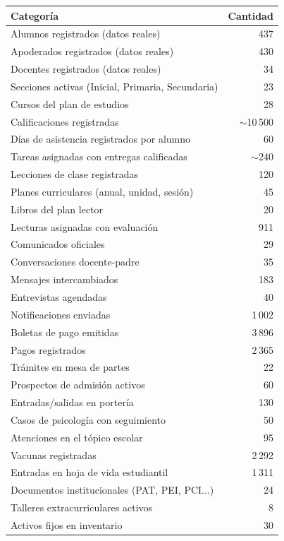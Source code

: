 \documentclass[11pt,a4paper]{article}
\begin{document}
\begin{tabularx}{\textwidth}{@{}Xr@{}}
\toprule
\textbf{Categoría} & \textbf{Cantidad} \\
\midrule
Alumnos registrados (datos reales) & 437 \\
Apoderados registrados (datos reales) & 430 \\
Docentes registrados (datos reales) & 34 \\
Secciones activas (Inicial, Primaria, Secundaria) & 23 \\
Cursos del plan de estudios & 28 \\
\addlinespace
Calificaciones registradas & $\sim$10\,500 \\
Días de asistencia registrados por alumno & 60 \\
Tareas asignadas con entregas calificadas & $\sim$240 \\
Lecciones de clase registradas & 120 \\
Planes curriculares (anual, unidad, sesión) & 45 \\
Libros del plan lector & 20 \\
Lecturas asignadas con evaluación & 911 \\
\addlinespace
Comunicados oficiales & 29 \\
Conversaciones docente-padre & 35 \\
Mensajes intercambiados & 183 \\
Entrevistas agendadas & 40 \\
Notificaciones enviadas & 1\,002 \\
\addlinespace
Boletas de pago emitidas & 3\,896 \\
Pagos registrados & 2\,365 \\
Trámites en mesa de partes & 22 \\
Prospectos de admisión activos & 60 \\
Entradas/salidas en portería & 130 \\
\addlinespace
Casos de psicología con seguimiento & 50 \\
Atenciones en el tópico escolar & 95 \\
Vacunas registradas & 2\,292 \\
Entradas en hoja de vida estudiantil & 1\,311 \\
\addlinespace
Documentos institucionales (PAT, PEI, PCI...) & 24 \\
Talleres extracurriculares activos & 8 \\
Activos fijos en inventario & 30 \\
\bottomrule
\end{tabularx}
\end{document}
